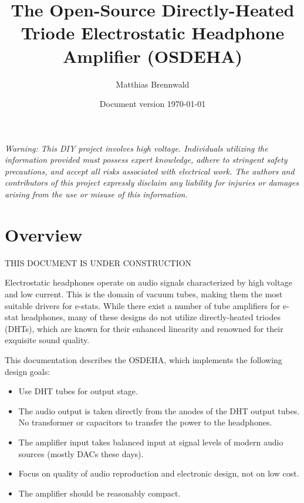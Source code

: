 


\title{The Open-Source Directly-Heated Triode Electrostatic Headphone Amplifier (OSDEHA)}
\author{Matthias Brennwald}
\date{Document version \today}



\twocolumn[\maketitle]

\begin{strip}
\emph{Warning: This DIY project involves high voltage. Individuals utilizing the information provided must possess expert knowledge, adhere to stringent safety precautions, and accept all risks associated with electrical work. The authors and contributors of this project expressly disclaim any liability for injuries or damages arising from the use or misuse of this information.}
\end{strip}

\section{Overview}

THIS DOCUMENT IS UNDER CONSTRUCTION

Electrostatic headphones operate on audio signals characterized by high voltage and low current. This is the domain of vacuum tubes, making them the most suitable drivers for e-stats.  While there exist a number of tube amplifiers for e-stat headphones, many of these designs do not utilize directly-heated triodes (DHTs), which are known for their enhanced linearity and renowned for their exquisite sound quality.\par

This documentation describes the OSDEHA, which implements the following design goals:
\begin{itemize}
\item Use DHT tubes for output stage.
\item The audio output is taken directly from the anodes of the DHT output tubes. No transformer or capacitors to transfer the power to the headphones.
\item The amplifier input takes balanced input at signal levels of modern audio sources (mostly DACs these days).
\item Focus on quality of audio reproduction and electronic design, not on low cost.
\item The amplifier should be reasonably compact.
\end{itemize}

